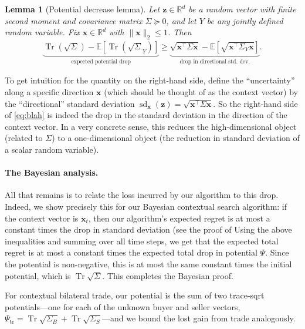 \documentclass[11pt]{article}
\newtheorem{lemma}[theorem]{Lemma}
\newcommand{\E}[1]{\mathbb E\left[#1\right]}
\newcommand{\R}{\mathbb R}
\DeclareMathOperator{\sd}{sd}
\DeclareMathOperator{\Tr}{Tr}
\newcommand{\norm}[1]{\lVert #1\rVert_2}
\newcommand{\bx}{\boldsymbol x}
\newcommand{\bz}{\boldsymbol z}
\begin{document}
\begin{lemma}[Potential decrease lemma]\label{lem:directional-sd-decrease}
  Let $\bz\in\R^d$ be a random vector with {finite second moment and covariance matrix}
  $\Sigma \succeq 0$, and let $Y$ be any jointly defined random
  variable. Fix $\bx\in\R^d$ with $\norm{\bx}\le1$. Then
\begin{gather}
  \underbrace{\Tr(\sqrt \Sigma) - {\E{\Tr (\sqrt
    \Sigma_Y)}}}_{\text{expected potential drop}} \geq
  \underbrace{\sqrt{\bx^\top\Sigma\bx}
      -\E{\sqrt{\bx^\top\Sigma_Y\bx}}}_{\text{drop in directional std.\ dev.}}.  \label{eq:blah}
\end{gather}
\end{lemma}

To get intuition for the quantity on the {right-hand side}, define the ``uncertainty'' along a specific direction $\bx$ (which should be thought of as the context vector) by the ``directional'' standard deviation
$\sd_{\bx}(\bz)=\sqrt{\bx^\top\Sigma\bx}$.
So the {right-hand side} of \eqref{eq:blah} is indeed the drop in the standard deviation in the direction of the context vector. 
In a very concrete sense, this reduces the high-dimensional object
(related to $\Sigma$) to a one-dimensional object (the reduction in
standard deviation of a scalar random variable).


\paragraph{The Bayesian analysis.}

All that remains is to relate the loss incurred by our algorithm to
this drop. Indeed, we show precisely this for our Bayesian contextual
search algorithm: if the context vector is $\bx_t$, then our
algorithm's expected regret is at most a constant times the drop in
standard deviation (see the proof of
 Using the above inequalities
and summing over all {time steps}, we get that the expected total regret
is at most {a constant times the expected total drop} in potential $\Psi$. Since the
potential is non-negative, this is at most {the same constant times the initial potential},
which is $\Tr
\sqrt{\Sigma}${.} 
{This completes} the Bayesian proof.

For contextual bilateral trade, our potential is the sum of two
{trace-sqrt potentials}---one for each of the unknown buyer and seller
vectors,
$\Psi_{\mathrm{tr}} = \Tr \sqrt{\Sigma_B}+\Tr \sqrt{\Sigma_S}$---and
we bound the {lost gain from trade} analogously.
\end{document}
